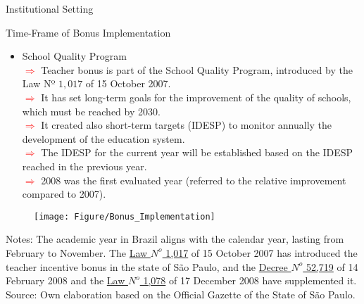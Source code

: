 \documentclass{beamer}
\begin{document}
\begin{frame}{Institutional Setting}
\vspace{0.3cm}
\begin{block}{\centering \Large Time-Frame of Bonus Implementation}
\begin{itemize}
\item \normalsize School Quality Program 
\\ \tiny\textcolor{red}{$\Longrightarrow$} Teacher bonus is part of the School Quality Program, introduced by the Law Nº $1,017$ of 15 October 2007.
\\ \tiny\textcolor{red}{$\Longrightarrow$} It has set long-term goals for the improvement of the quality of schools, which must be reached by 2030.
\\ \tiny\textcolor{red}{$\Longrightarrow$} It created also short-term targets (IDESP) to monitor annually the development of the education system.
\\ \tiny\textcolor{red}{$\Longrightarrow$} The IDESP for the current year will be established based on the IDESP reached in the previous year.
\\ \tiny\textcolor{red}{$\Longrightarrow$} 2008 was the first evaluated year (referred to the relative improvement compared to 2007). 
\end{itemize}
\end{block}

\begin{figure}[htb]
\centering
\texttt{[image: Figure/Bonus\_Implementation]}
\end{figure}
     \vspace{-3.67cm}  \hspace{2pt}
\begin{minipage}{1\textwidth} 
{{\fontsize{4}{4}\selectfont  
Notes: The academic year in Brazil aligns with the calendar year, lasting from February to November. The \href{http://tiny.cc/4opsaz}{Law $N^{o}$ 1,017} of 15 October 2007 has introduced the teacher incentive bonus in the state of São Paulo, and the \href{http://tiny.cc/ympsaz}{Decree $N^{o}$ 52,719} of 14 February 2008 and the \href{http://tiny.cc/0wpsaz}{Law $N^{o}$ 1,078} of 17 December 2008 have supplemented it. \\
Source: Own elaboration based on the Official Gazette of the State of São Paulo.\par}}
\end{minipage} 
\end{frame}
\end{document}
